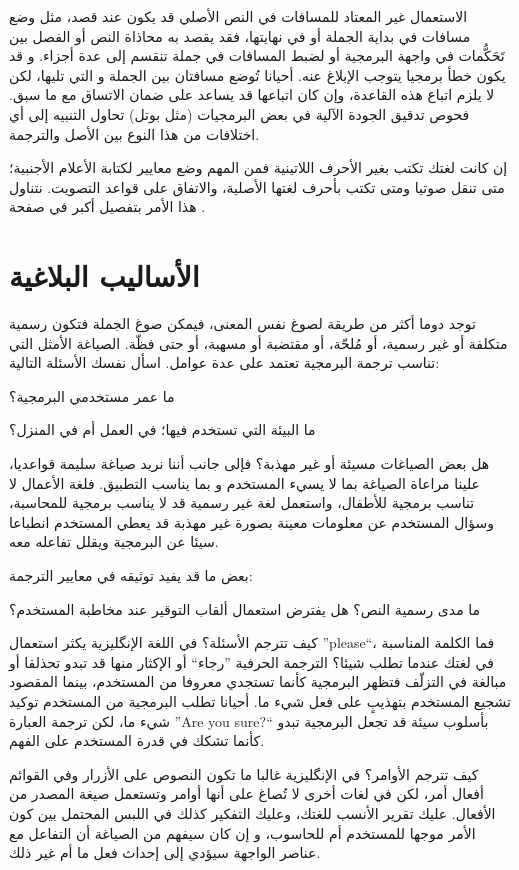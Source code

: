 الاستعمال غير المعتاد للمسافات في النص الأصلي قد يكون عند قصد، مثل وضع
مسافات في بداية الجملة أو في نهايتها، فقد يقصد به محاذاة النص أو الفصل
بين تَحَكُّمات في واجهة البرمجية أو لضبط المسافات في جملة تنقسم إلى عدة
أجزاء. و قد يكون خطأ برمجيا يتوجب الإبلاغ عنه. أحيانا تُوضع مسافتان بين
الجملة و التي تليها، لكن لا يلزم اتباع هذه القاعدة، وإن كان اتباعها قد
يساعد على ضمان الاتساق مع ما سبق. فحوص تدقيق الجودة الآلية في بعض
البرمجيات (مثل بوتل) تحاول التنبيه إلى أي اختلافات من هذا النوع بين
الأصل والترجمة.

إن كانت لغتك تكتب بغير الأحرف اللاتينية فمن المهم وضع معايير لكتابة
الأعلام الأجنبية؛ متى تنقل صوتيا ومتى تكتب بأحرف لغتها الأصلية،
والاتفاق على قواعد التصويت. نتناول هذا الأمر بتفصيل أكبر في صفحة
\at[ref:20221205].

\section{الأساليب البلاغية}
توجد دوما أكثر من طريقة لصوغ نفس المعنى، فيمكن صوغ الجملة فتكون رسمية
متكلفة أو غير رسمية، أو مُلحّة، أو مقتضبة أو مسهبة، أو حتى فظّة.
الصياغة الأمثل التي تناسب ترجمة البرمجية تعتمد على عدة عوامل. اسأل نفسك
الأسئلة التالية:

\startitemize[1]
\item ما عمر مستخدمي البرمجية؟
\item ما البيئة التي تستخدم فيها؛ في العمل أم في المنزل؟
\item هل بعض الصياغات مسيئة أو غير مهذبة؟
\stopitemize
فإلى جانب أننا نريد صياغة سليمة قواعديا، علينا مراعاة الصياغة بما لا
يسيء المستخدم و بما يناسب التطبيق. فلغة الأعمال لا تناسب برمجية
للأطفال، واستعمل لغة غير رسمية قد لا يناسب برمجية للمحاسبة، وسؤال
المستخدم عن معلومات معينة بصورة غير مهذبة قد يعطي المستخدم انطباعا سيئا
عن البرمجية ويقلل تفاعله معه. 

بعض ما قد يفيد توثيقه في معايير الترجمة:

\startitemize[1]
\item ما مدى رسمية النص؟ هل يفترض استعمال ألقاب التوقير عند مخاطبة
المستخدم؟
\item كيف تترجم الأسئلة؟ في اللغة الإنگليزية يكثر استعمال ”please“، فما
الكلمة المناسبة في لغتك عندما تطلب شيئا؟ الترجمة الحرفية ”رجاء“ أو
الإكثار منها قد تبدو تحذلقا أو مبالغة في التزلّف فتظهر البرمجية كأنما
تستجدي معروفا من المستخدم، بينما المقصود تشجيع المستخدم بتهذيبٍ على فعل
شيء ما. أحيانا تطلب البرمجية من المستخدم توكيد شيء ما، لكن ترجمة
العبارة ”Are you sure?“ بأسلوب سيئة قد تجعل البرمجية تبدو كأنما تشكك في
قدرة المستخدم على الفهم.
\item كيف تترجم الأوامر؟ في الإنگليزية غالبا ما تكون النصوص على الأزرار
وفي القوائم أفعال أمر، لكن في لغات أخرى لا تُصاغ على أنها أوامر وتستعمل
صيغة المصدر من الأفعال. عليك تقرير الأنسب للغتك، وعليك التفكير كذلك في
اللبس المحتمل بين كون الأمر موجها للمستخدم أم للحاسوب، و إن كان سيفهم
من الصياغة أن التفاعل مع عناصر الواجهة سيؤدي إلى إحداث فعل ما أم غير
ذلك.
\stopitemize

